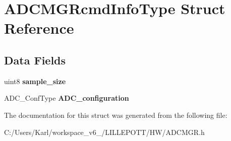 \hypertarget{struct_a_d_c_m_g_rcmd_info_type}{}\section{A\+D\+C\+M\+G\+Rcmd\+Info\+Type Struct Reference}
\label{struct_a_d_c_m_g_rcmd_info_type}
\subsection*{Data Fields}
\begin{DoxyCompactItemize}
\item 
\mbox{\label{struct_a_d_c_m_g_rcmd_info_type_a18b5981baee94493a2bd06ff64a87918}} 
uint8 {\bfseries sample\+\_\+size}
\item 
\mbox{\label{struct_a_d_c_m_g_rcmd_info_type_a4a95d6b1dfae20b7c0e6ca140cf67f35}} 
A\+D\+C\+\_\+\+Conf\+Type {\bfseries A\+D\+C\+\_\+configuration}
\end{DoxyCompactItemize}


The documentation for this struct was generated from the following file\+:\begin{DoxyCompactItemize}
\item 
C\+:/\+Users/\+Karl/workspace\+\_\+v6\+\_/\+L\+I\+L\+L\+E\+P\+O\+T\+T/\+H\+W/A\+D\+C\+M\+G\+R.\+h\end{DoxyCompactItemize}
